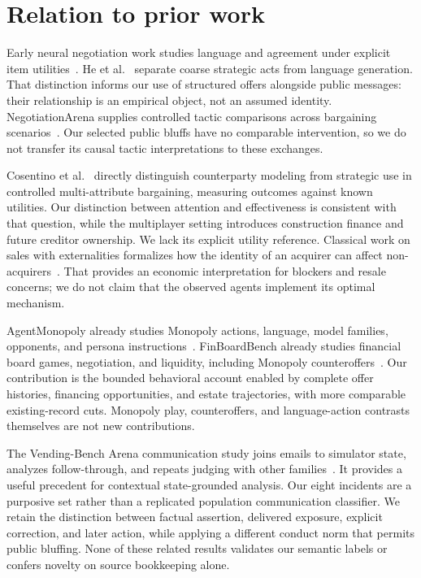 \section{Relation to prior work}

Early neural negotiation work studies language and agreement under explicit item utilities~\cite{lewis2017deal}. He et al.~\cite{he2018decoupling} separate coarse strategic acts from language generation. That distinction informs our use of structured offers alongside public messages: their relationship is an empirical object, not an assumed identity. NegotiationArena supplies controlled tactic comparisons across bargaining scenarios~\cite{bianchi2024negotiationarena}. Our selected public bluffs have no comparable intervention, so we do not transfer its causal tactic interpretations to these exchanges.

Cosentino et al.~\cite{cosentino2026counterparty} directly distinguish counterparty modeling from strategic use in controlled multi-attribute bargaining, measuring outcomes against known utilities. Our distinction between attention and effectiveness is consistent with that question, while the multiplayer setting introduces construction finance and future creditor ownership. We lack its explicit utility reference. Classical work on sales with externalities formalizes how the identity of an acquirer can affect non-acquirers~\cite{jehiel1996externalities}. That provides an economic interpretation for blockers and resale concerns; we do not claim that the observed agents implement its optimal mechanism.

AgentMonopoly already studies Monopoly actions, language, model families, opponents, and persona instructions~\cite{wu2026agentmonopoly}. FinBoardBench already studies financial board games, negotiation, and liquidity, including Monopoly counteroffers~\cite{hu2026finboardbench}. Our contribution is the bounded behavioral account enabled by complete offer histories, financing opportunities, and estate trajectories, with more comparable existing-record cuts. Monopoly play, counteroffers, and language-action contrasts themselves are not new contributions.

The Vending-Bench Arena communication study joins emails to simulator state, analyzes follow-through, and repeats judging with other families~\cite{li2026arena}. It provides a useful precedent for contextual state-grounded analysis. Our eight incidents are a purposive set rather than a replicated population communication classifier. We retain the distinction between factual assertion, delivered exposure, explicit correction, and later action, while applying a different conduct norm that permits public bluffing. None of these related results validates our semantic labels or confers novelty on source bookkeeping alone.

